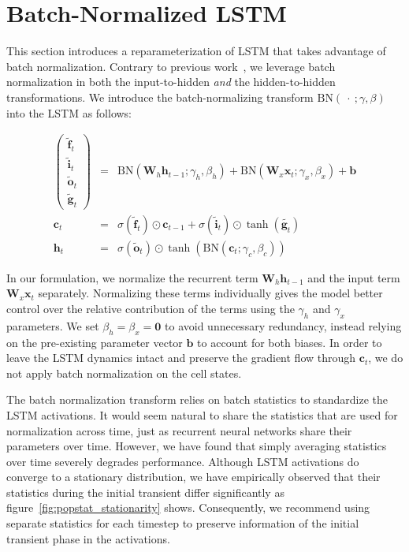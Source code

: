 \documentclass{article} %
\newcommand{\vect}[1]{\mathbf{#1}}
\newcommand{\mat}[1]{\mathbf{#1}}
\newcommand{\ewprod}{\odot}
\begin{document}
\section{Batch-Normalized LSTM}
\label{sec:recurrent-batch-normalization}

This section introduces a reparameterization of LSTM that takes advantage of 
batch normalization. Contrary to previous work~\cite{cesar, baidu}, we 
leverage batch normalization in both the input-to-hidden \emph{and} the hidden-to-hidden transformations.
We introduce the batch-normalizing transform $\mathrm{BN}(\ \cdot\ ; \gamma, \beta)$ 
into the LSTM as follows:

\begin{eqnarray}
\left(\begin{array}{ccc}
\tilde{\vect{f}}_t \\
\tilde{\vect{i}}_t \\
\tilde{\vect{o}}_t \\
\tilde{\vect{g}}_t
\end{array}\right)
 &=&
 \mathrm{BN} (\mat{W}_h \vect{h}_{t-1}; \gamma_h, \beta_h) +
 \mathrm{BN} (\mat{W}_x \vect{x}_t   ; \gamma_x, \beta_x) +
 \vect{b}
\\
\vect{c}_t &=& \sigma(\tilde{\vect{f}}_t) \ewprod \vect{c}_{t-1} +
               \sigma(\tilde{\vect{i}}_t) \ewprod \tanh(\tilde{\vect{g}_t}) \\
\vect{h}_t &=& \sigma(\tilde{\vect{o}}_t) \ewprod \tanh(
 \mathrm{BN} (\vect{c}_t; \gamma_c, \beta_c)
)
\end{eqnarray}



In our formulation, we normalize the recurrent term $\mat{W}_h \vect{h}_{t-1}$ and the input term $\mat{W}_x \vect{x}_t$ separately.
Normalizing these terms individually gives the model better control over the relative contribution of the terms using the $\gamma_h$ and $\gamma_x$ parameters.
We set $\beta_h = \beta_x = \vect{0}$ to avoid unnecessary redundancy, instead relying on the pre-existing parameter vector $\vect{b}$ to account for both biases.
In order to leave the LSTM dynamics intact and preserve the gradient flow through $\vect{c}_t$, we do not apply batch normalization on the cell states.


The batch normalization transform relies on batch statistics to standardize the LSTM activations.
It would seem natural to share the statistics that are used for normalization across time,
just as recurrent neural networks share their parameters over time.
However, we have found that simply averaging statistics over time severely degrades performance.
Although LSTM activations do converge to a stationary distribution, we have empirically observed that their statistics during the initial transient differ significantly as figure~\ref{fig:popstat_stationarity} shows.
Consequently, we recommend using separate statistics for each timestep to preserve
information of the initial transient phase in the activations.
\end{document}
